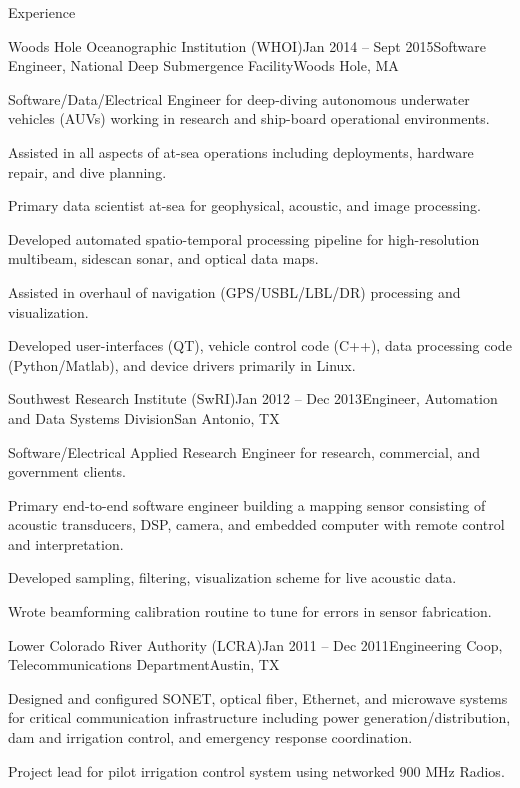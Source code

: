 \documentclass{resume} %
\begin{document}
\begin{rSection}{Experience}
\begin{rSubsection}{Woods Hole Oceanographic Institution (WHOI)}{Jan 2014 -- Sept 2015}{Software Engineer, National Deep Submergence Facility}{Woods Hole, MA}
\item{Software/Data/Electrical Engineer for deep-diving autonomous underwater vehicles (AUVs) working in research and ship-board operational environments.}
\item{Assisted in all aspects of at-sea operations including deployments, hardware repair, and dive planning.}
\item{Primary data scientist at-sea for geophysical, acoustic, and image processing.}
\item{Developed automated spatio-temporal processing pipeline for high-resolution multibeam, sidescan sonar, and optical data maps.}
\item{Assisted in overhaul of navigation (GPS/USBL/LBL/DR) processing and visualization.}
\item{Developed user-interfaces (QT), vehicle control code (C++), data processing code (Python/Matlab), and device drivers primarily in Linux.}
\end{rSubsection}
%
\begin{rSubsection}{Southwest Research Institute (SwRI)}{Jan 2012 -- Dec 2013}{Engineer, Automation and Data Systems Division}{San Antonio, TX}{}
\item{Software/Electrical Applied Research Engineer for research, commercial, and government clients.}
\item{Primary end-to-end software engineer building a mapping sensor consisting of acoustic transducers, DSP, camera, and embedded computer with remote control and interpretation.}
\item{Developed sampling, filtering, visualization scheme for live acoustic data.}
\item{Wrote beamforming calibration routine to tune for errors in sensor fabrication.}
\end{rSubsection}


\begin{rSubsection}{Lower Colorado River Authority (LCRA)}{Jan 2011 -- Dec 2011}{Engineering Coop, Telecommunications Department}{Austin, TX}
\item{Designed and configured SONET, optical fiber, Ethernet, and microwave systems for critical communication infrastructure including power generation/distribution, dam and 
            irrigation control, and emergency response coordination. }
\item{Project lead for pilot irrigation control system using networked 900 MHz Radios.}
\end{rSubsection}
\end{rSection}
\end{document}

